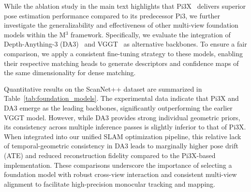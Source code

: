 While the ablation study in the main text highlights that Pi3X~\cite{wang2025pi} delivers superior pose estimation performance compared to its predecessor Pi3, we further investigate the generalizability and effectiveness of other multi-view foundation models within the M$^3$ framework. Specifically, we evaluate the integration of Depth-Anything-3 (DA3)~\cite{lin2025depth} and VGGT~\cite{wang2025vggt} as alternative backbones. To ensure a fair comparison, we apply a consistent fine-tuning strategy to these models, enabling their respective matching heads to generate descriptors and confidence maps of the same dimensionality for dense matching.

Quantitative results on the ScanNet++ dataset are summarized in Table~\ref{tab:foundation_models}. The experimental data indicate that Pi3X and DA3 emerge as the leading backbones, significantly outperforming the earlier VGGT model. However, while DA3 provides strong individual geometric priors, its consistency across multiple inference passes is slightly inferior to that of Pi3X. When integrated into our unified SLAM optimization pipeline, this relative lack of temporal-geometric consistency in DA3 leads to marginally higher pose drift (ATE) and reduced reconstruction fidelity compared to the Pi3X-based implementation. These comparisons underscore the importance of selecting a foundation model with robust cross-view interaction and consistent multi-view alignment to facilitate high-precision monocular tracking and mapping.

\begin{table}[t]
\centering
\renewcommand{\arraystretch}{1.1}
\setlength{\tabcolsep}{2pt}
\caption{\textbf{Comparison of Multi-view Foundation Models within the M$^3$ Framework.} 
We evaluate the performance of different backbones on the ScanNet++ dataset~\cite{yeshwanth2023scannet++}. 
Pi3X~\cite{wang2025pi} and Depth-Anything-3~\cite{lin2025depth} represent the state-of-the-art in geometric priors, 
with Pi3X achieving the highest accuracy due to its superior cross-inference consistency.}
\vspace{-6pt}
\label{tab:foundation_models}
\vspace{-6pt}
\end{table}



